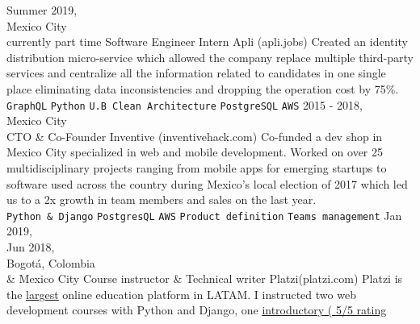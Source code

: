 \documentclass[9pt]{developercv}
\begin{document}
\begin{entrylist}
    \entry
        {
            Summer 2019,\\
            Mexico City\\
            \footnotesize{currently part time}
        }
        {Software Engineer Intern}
        {Apli (apli.jobs)}
        {
            Created an identity distribution micro-service which allowed the
            company replace multiple third-party services and centralize all the
            information related to candidates in one single place eliminating data
            inconsistencies and dropping the operation cost by 75\%.\\
                \texttt{GraphQL}\slashsep
                \texttt{Python}\slashsep
                \texttt{U.B Clean Architecture}\slashsep
                \texttt{PostgreSQL}\slashsep
                \texttt{AWS}
        }
    \entry
        {
            2015 - 2018,\\
            Mexico City\\
        }
        {CTO \& Co-Founder}
        {Inventive (inventivehack.com)}
        {
            Co-funded a dev shop in Mexico City specialized in web and mobile development.
            Worked on over 25 multidisciplinary projects ranging from mobile apps for
            emerging startups to software used across the country during Mexico's local election
            of 2017 which led us to a 2x growth in team members and sales on the last year.\\
                \texttt{Python \& Django}\slashsep
                \texttt{PostgresQL}\slashsep
                \texttt{AWS}\slashsep
                \texttt{Product definition}\slashsep
                \texttt{Teams management}
        }
    \entry
        {
            Jan 2019,\\
            Jun 2018,\\
            Bogotá, Colombia\\ \& Mexico City
        }
        {Course instructor \& Technical writer}
        {Platzi(platzi.com)}
        {
            Platzi is the {\href{https://thenextweb.com/insider/2015/03/23/how-platzi-bootstrapped-its-way-into-y-combinator-to-build-the-future-of-education/}{\underline{largest}}}
            online education platform in LATAM. I instructed two web development courses with Python and Django, one
            {\href{https://platzi.com/cursos/django/}{\underline{introductory} (
                \underline{{\href{https://platzi.com/cursos/django/opiniones/1/}{5/5 rating}}}
}}}
\end{entrylist}
\end{document}
